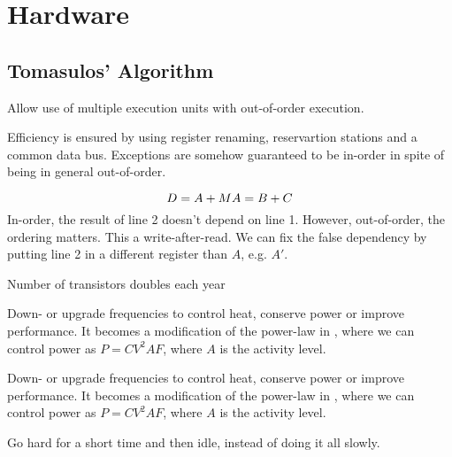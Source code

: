 \section{Hardware}

\subsection{Tomasulos' Algorithm}
Allow use of multiple execution units with out-of-order execution.

Efficiency is ensured by using register renaming, reservartion stations and a common data bus.  Exceptions are somehow guaranteed to be in-order in spite of being in general out-of-order.

\begin{definition}\label{def:registerrename}
    \begin{equation}
        D = A + M \\
        A = B + C
    \end{equation}
    In-order, the result of line 2 doesn't depend on line 1. However, out-of-order,
    the ordering matters. This a write-after-read. We can fix the false dependency
    by putting line 2 in a different register than $A$, e.g. $A'$.
\end{definition}

\begin{definition}
    Number of transistors doubles each year
\end{definition}

\begin{definition}\label{def:dynamicscaling}
    Down- or upgrade frequencies to control heat, conserve power or improve performance. It becomes a modification of the  power-law in \label{sec:powerdissipation}, where we can control power as $P = CV^{2}AF$, where $A$
    is the activity level.
\end{definition}

\begin{definition}\label{def:dynamicscaling}
    Down- or upgrade frequencies to control heat, conserve power or improve performance. It becomes a modification of the  power-law in \label{sec:powerdissipation}, where we can control power as $P = CV^{2}AF$, where $A$
    is the activity level.
\end{definition}

\begin{definition}
    Go hard for a short time and then idle, instead of doing it all slowly.
\end{definition}

